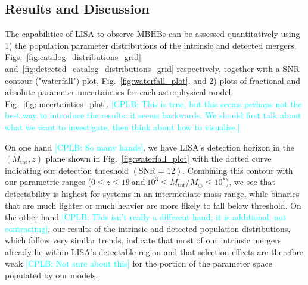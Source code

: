 \documentclass[a4paper,12pt]{article}
\newcommand{\cplb}[1]{\textcolor{cyan}{[CPLB: #1]}}
\begin{document}
\subsection{Results and Discussion}
\label{subsec:popresults}

The capabilities of LISA to observe MBHBs can be assessed quantitatively using 1) the population parameter distributions of the intrinsic and detected mergers, Figs.~\ref{fig:catalog_distributions_grid} and~\ref{fig:detected_catalog_distributions_grid} respectively, together with a SNR contour ("waterfall") plot, Fig.~\ref{fig:waterfall_plot}, and 2) plots of fractional and absolute parameter uncertainties for each astrophysical model, Fig.~\ref{fig:uncertainties_plot}. \cplb{This is true, but this seems perhaps not the best way to introduce the results: it seems backwards. We should first talk about what we want to investigate, then think about how to visualise.}

On one hand \cplb{So many hands}, we have LISA's detection horizon in the $(M_\mathrm{tot},z)$ plane shown in Fig.~\ref{fig:waterfall_plot} with the dotted curve indicating our detection threshold $(\mathrm{SNR} = 12)$. 
Combining this contour with our parametric ranges ($0\le z \le 19~\mathrm{and}~10^{3} \le M_{\mathrm{tot}}/M_{\odot} \le 10^{8}$), we see that detectability is highest for systems in an intermediate mass range, while binaries that are much lighter or much heavier are more likely to fall below threshold. 
On the other hand \cplb{This isn't really a different hand; it is additional, not contrasting}, our results of the intrinsic and detected population distributions, which follow very similar trends, indicate that most of our intrinsic mergers already lie within LISA's detectable region and that selection effects are therefore weak \cplb{Not sure about this} for the portion of the parameter space populated by our models.
\end{document}
